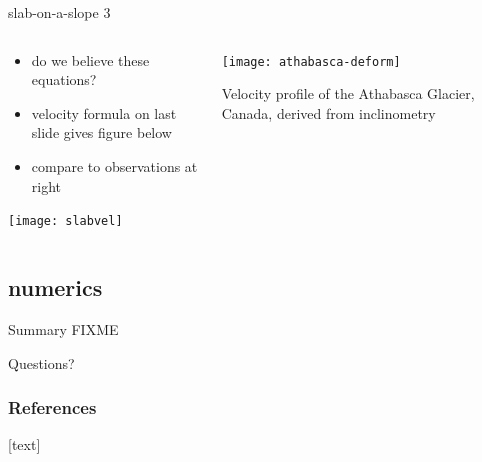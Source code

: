 \documentclass[10pt,dvipsnames]{beamer}
\begin{document}
\begin{frame}{slab-on-a-slope 3}

\begin{columns}
\begin{column}{0.6\textwidth}
\begin{itemize}
\item do we believe these equations?
\item velocity formula on last slide gives figure below
\item compare to observations at right
\end{itemize}
\begin{center}
\texttt{[image: slabvel]}
\end{center}
\end{column}

\begin{column}{0.4\textwidth}
\texttt{[image: athabasca-deform]}

\medskip
\scriptsize
Velocity profile of the Athabasca Glacier, Canada, derived from inclinometry \cite{SavagePaterson1963}
\end{column}
\end{columns}
\end{frame}


\subsection{numerics}

\begin{frame}{Summary}
FIXME
\end{frame}

\begin{frame}[standout]
  Questions?
\end{frame}

\appendix


\begin{frame}[allowframebreaks]
\frametitle{References}
[text]

  
  
\end{frame}
\end{document}
